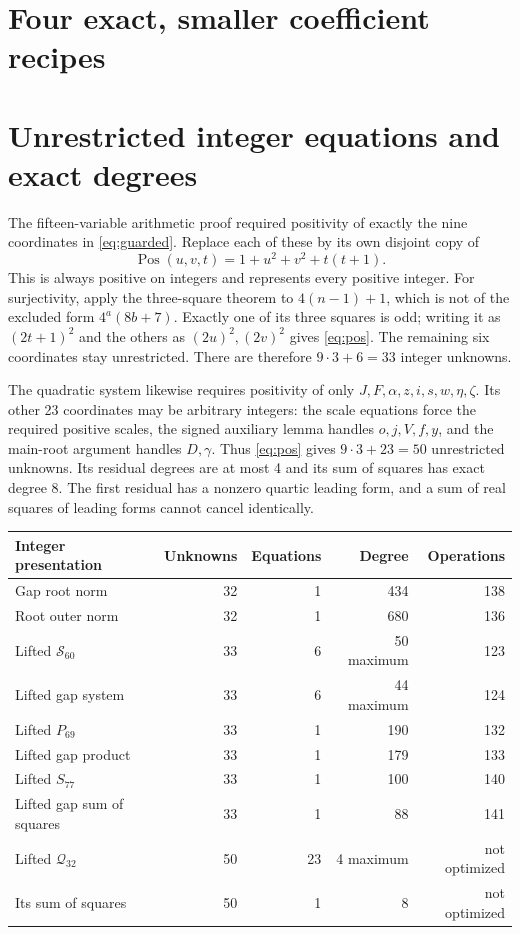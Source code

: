 \documentclass[11pt,a4paper]{article}
\theoremstyle{definition}\newtheorem{definition}[theorem]{Definition}
\theoremstyle{remark}\newtheorem{remark}[theorem]{Remark}
\begin{document}
\section{Four exact, smaller coefficient recipes}
\label{sec:coefficients}


\section{Unrestricted integer equations and exact degrees}
\label{sec:integer}

The fifteen-variable arithmetic proof required positivity of exactly
the nine coordinates in \eqref{eq:guarded}. Replace each of these by
its own disjoint copy of
\begin{equation}\label{eq:pos}
 \operatorname{Pos}(u,v,t)=1+u^2+v^2+t(t+1).
\end{equation}
This is always positive on integers and represents every positive
integer. For surjectivity, apply the three-square theorem to
\(4(n-1)+1\), which is not of the excluded form \(4^a(8b+7)\).
Exactly one of its three squares is odd; writing it as \((2t+1)^2\)
and the others as \((2u)^2,(2v)^2\) gives \eqref{eq:pos}.
The remaining six coordinates stay unrestricted. There are therefore
\(9\cdot3+6=33\) integer unknowns.

The quadratic system likewise requires positivity of only
\(J,F,\alpha,z,i,s,w,\eta,\zeta\). Its other 23 coordinates may
be arbitrary integers: the scale equations force the required
positive scales, the signed auxiliary lemma handles \(o,j,V,f,y\),
and the main-root argument handles \(D,\gamma\). Thus
\eqref{eq:pos} gives \(9\cdot3+23=50\) unrestricted unknowns.
Its residual degrees are at most 4 and its sum of squares has exact
degree 8. The first residual has a nonzero quartic leading form,
and a sum of real squares of leading forms cannot cancel identically.

\begin{center}\small
\begin{tabular}{@{}lrrrr@{}}
\toprule
Integer presentation & Unknowns & Equations & Degree & Operations\\
\midrule
Gap root norm&32&1&434&138\\
Root outer norm&32&1&680&136\\
Lifted \(\mathcal S_{60}\)&33&6&50 maximum&123\\
Lifted gap system&33&6&44 maximum&124\\
Lifted \(P_{69}\)&33&1&190&132\\
Lifted gap product&33&1&179&133\\
Lifted \(S_{77}\)&33&1&100&140\\
Lifted gap sum of squares&33&1&88&141\\
Lifted \(\mathcal Q_{32}\)&50&23&4 maximum&not optimized\\
Its sum of squares&50&1&8&not optimized\\
\bottomrule
\end{tabular}
\end{center}
\end{document}
